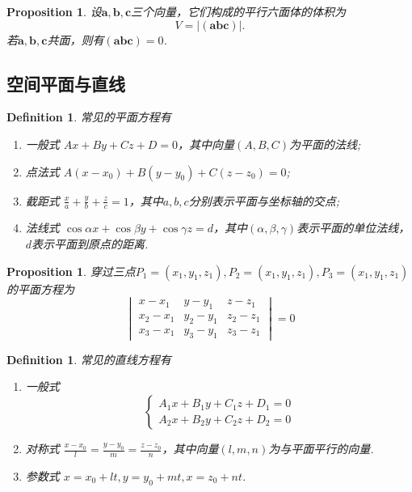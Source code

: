 \documentclass{article}
\newcommand{\mbf}[1]{\bm{#1}}
\newtheorem{proposition}[theorem]{Proposition}
\newtheorem{definition}[theorem]{Definition}
\begin{document}
\begin{proposition}
\rm 设$\mbf{a},\mbf{b},\mbf{c}$三个向量，它们构成的平行六面体的体积为
$$
V = |(\mbf{a}\mbf{b}\mbf{c})|.
$$
若$\mbf{a},\mbf{b},\mbf{c}$共面，则有$(\mbf{a}\mbf{b}\mbf{c})=0$.  
\end{proposition}

\subsection{空间平面与直线}

\begin{definition}
\rm 常见的平面方程有
\begin{enumerate}
	\item 一般式 $Ax+By+Cz+D = 0$，其中向量$(A,B,C)$为平面的法线;
	\item 点法式 $A(x-x_0) + B(y-y_0) + C(z-z_0) = 0$;
	\item 截距式 $\frac{x}{a} + \frac{y}{b} + \frac{z}{c} = 1$，其中$a,b,c$分别表示平面与坐标轴的交点;
	\item 法线式 $\cos\alpha x + \cos\beta y + \cos\gamma z = d$，其中$(\alpha,\beta,\gamma)$表示平面的单位法线，$d$表示平面到原点的距离. 
\end{enumerate}
\end{definition}

\begin{proposition}
\rm 穿过三点$P_1 = (x_1,y_1,z_1),P_2 = (x_1,y_1,z_1),P_3 = (x_1,y_1,z_1)$的平面方程为
$$
{\begin{vmatrix}
x-x_{1} & y-y_{1} & z-z_{1}\\
x_{2}-x_{1} & y_{2}-y_{1} & z_{2}-z_{1}\\
x_{3}-x_{1} & y_{3}-y_{1} & z_{3}-z_{1}
\end{vmatrix}}=0
$$
\end{proposition}

\begin{definition}
\rm 常见的直线方程有
\begin{enumerate}
	\item 一般式
		$$
			\left\{
			\begin{array}{ll}
			A_1x+B_1y+C_1z+D_1 = 0 \\
			A_2x+B_2y+C_2z+D_2 = 0
			\end{array} \right.
		$$
	\item 对称式 $\frac{x-x_0}{l} = \frac{y-y_0}{m} = \frac{z-z_0}{n}$，其中向量$(l,m,n)$为与平面平行的向量.
	\item 参数式 $x = x_0 + lt,y = y_0 + mt,x = z_0 + nt$. 	
\end{enumerate}
\end{definition}
\end{document}
